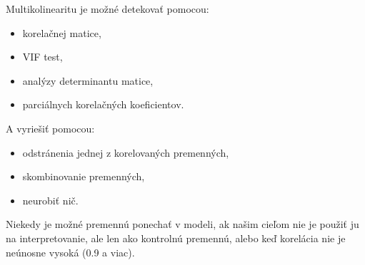 Multikolinearitu je možné detekovať pomocou:

\begin{itemize}
\tightlist
\item
  korelačnej matice,
\item
  VIF test,
\item
  analýzy determinantu matice,
\item
  parciálnych korelačných koeficientov.
\end{itemize}

A vyriešiť pomocou:

\begin{itemize}
\tightlist
\item
  odstránenia jednej z korelovaných premenných,
\item
  skombinovanie premenných,
\item
  neurobiť nič.
\end{itemize}

Niekedy je možné premennú ponechať v modeli, ak našim cieľom nie je
použiť ju na interpretovanie, ale len ako kontrolnú premennú, alebo keď
korelácia nie je neúnosne vysoká (0.9 a viac).




